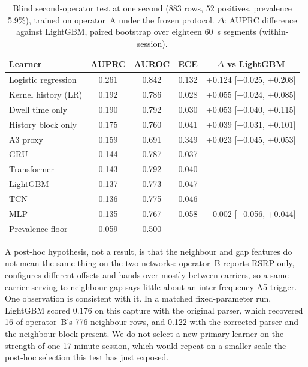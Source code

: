 \documentclass[preprint,review,12pt]{elsarticle}\usepackage{lineno}\linenumbers
\begin{document}
\begin{table}[t]
\centering
\caption{Blind second-operator test at one second (883 rows, 52 positives, prevalence 5.9\%), trained on operator~A under the frozen protocol. $\Delta$: AUPRC difference against LightGBM, paired bootstrap over eighteen 60~s segments (within-session).}
\label{tab:blind}
\footnotesize
\setlength{\tabcolsep}{2.5pt}
\begin{tabularx}{\linewidth}{X c c c c}
\toprule
\textbf{Learner} & \textbf{AUPRC} & \textbf{AUROC} & \textbf{ECE} & \textbf{$\Delta$ vs LightGBM} \\
\midrule
Logistic regression & 0.261 & 0.842 & 0.132 & +0.124 [+0.025, +0.208] \\
Kernel history (LR) & 0.192 & 0.786 & 0.028 & +0.055 [$-$0.024, +0.085] \\
Dwell time only & 0.190 & 0.792 & 0.030 & +0.053 [$-$0.040, +0.115] \\
History block only & 0.175 & 0.760 & 0.041 & +0.039 [$-$0.031, +0.101] \\
A3 proxy & 0.159 & 0.691 & 0.349 & +0.023 [$-$0.045, +0.053] \\
GRU & 0.144 & 0.787 & 0.037 & --- \\
Transformer & 0.143 & 0.792 & 0.040 & --- \\
LightGBM & 0.137 & 0.773 & 0.047 & --- \\
TCN & 0.136 & 0.775 & 0.046 & --- \\
MLP & 0.135 & 0.767 & 0.058 & $-$0.002 [$-$0.056, +0.044] \\
Prevalence floor & 0.059 & 0.500 & --- & --- \\
\bottomrule
\end{tabularx}
\end{table}

A post-hoc hypothesis, not a result, is that the neighbour and gap features do not mean the same thing on the two networks: operator~B reports RSRP only, configures different offsets and hands over mostly between carriers, so a same-carrier serving-to-neighbour gap says little about an inter-frequency A5 trigger. One observation is consistent with it. In a matched fixed-parameter run, LightGBM scored 0.176 on this capture with the original parser, which recovered 16 of operator~B's 776 neighbour rows, and 0.122 with the corrected parser and the neighbour block present. We do not select a new primary learner on the strength of one 17-minute session, which would repeat on a smaller scale the post-hoc selection this test has just exposed.
\end{document}
